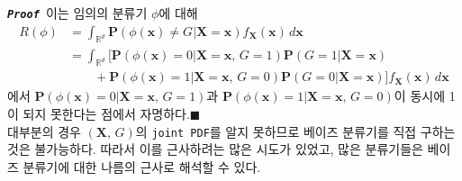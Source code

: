 \documentclass[10pt,onecolumn,twoside,a4size]{gsag3jnl}
\newcommand{\proof}{\texttt{\textit{\textbf{Proof }}}}
\begin{document}
\proof 이는 임의의 분류기 $\phi$에 대해
\begin{align}
  R(\phi)&=\int_{\mathbb{R}^d}\mathbf{P}(\phi(\mathbf{x})\ne G\vert\mathbf{X}=\mathbf{x})f_\mathbf{X}(\mathbf{x})\,d\mathbf{x}\\
  &=\int_{\mathbb{R}^d}[\mathbf{P}(\phi(\mathbf{x})=0\vert\mathbf{X}=\mathbf{x},\,G=1)\mathbf{P}(G=1\vert\mathbf{X}=\mathbf{x})\nonumber\\
  &\qquad+\mathbf{P}(\phi(\mathbf{x})=1\vert\mathbf{X}=\mathbf{x},\,G=0)\mathbf{P}(G=0\vert\mathbf{X}=\mathbf{x})]f_\mathbf{X}(\mathbf{x})\,d\mathbf{x}\nonumber
\end{align}
에서 $\mathbf{P}(\phi(\mathbf{x})=0\vert\mathbf{X}=\mathbf{x},\,G=1)$과 $\mathbf{P}(\phi(\mathbf{x})=1\vert\mathbf{X}=\mathbf{x},\,G=0)$이 동시에 1이 되지 못한다는 점에서 자명하다.\hfill$\blacksquare$\\

대부분의 경우 $(\mathbf{X},\,G)$의 \texttt{joint PDF}를 알지 못하므로 베이즈 분류기를 직접 구하는 것은 불가능하다. 따라서 이를 근사하려는 많은 시도가 있었고, 많은 분류기들은 베이즈 분류기에 대한 나름의 근사로 해석할 수 있다.
\end{document}
